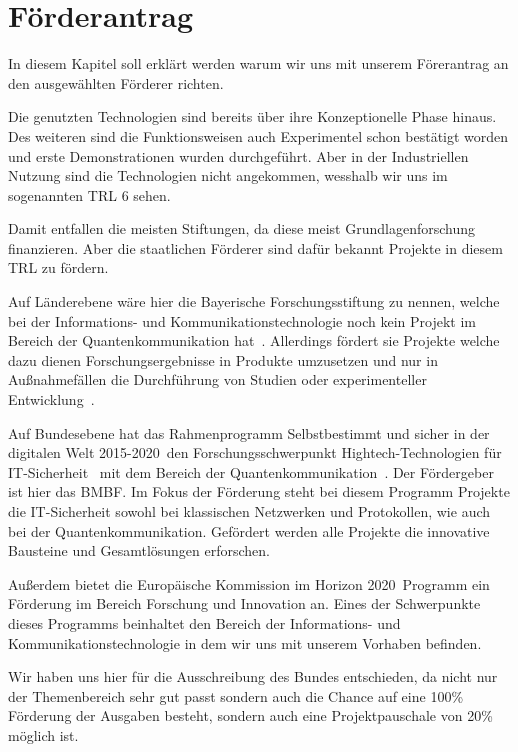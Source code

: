 \chapter{Förderantrag}\label{foerderantrag}

In diesem Kapitel soll erklärt werden warum wir uns mit unserem Förerantrag an den ausgewählten Förderer richten.

Die genutzten Technologien sind bereits über ihre Konzeptionelle Phase hinaus.
Des weiteren sind die Funktionsweisen auch Experimentel schon bestätigt worden und erste Demonstrationen wurden durchgeführt.
Aber in der Industriellen Nutzung sind die Technologien nicht angekommen, wesshalb wir uns im sogenannten \ac{TRL} 6 sehen.

Damit entfallen die meisten Stiftungen, da diese meist Grundlagenforschung finanzieren.
Aber die staatlichen Förderer sind dafür bekannt Projekte in diesem \ac{TRL} zu fördern.

Auf Länderebene wäre hier die Bayerische Forschungsstiftung zu nennen, welche bei der Informations- und Kommunikationstechnologie noch kein Projekt im Bereich der Quantenkommunikation hat~\cite{bayerischeForschungsstiftung}.
Allerdings fördert sie Projekte welche dazu dienen Forschungsergebnisse in Produkte umzusetzen und nur in Außnahmefällen die Durchführung von Studien oder experimenteller Entwicklung~\cite{bayerischeForschungsstiftung}.

Auf Bundesebene hat das Rahmenprogramm \glqq Selbstbestimmt und sicher in der digitalen Welt 2015-2020\grqq~den Forschungsschwerpunkt \glqq Hightech-Technologien für IT-Sicherheit \grqq~mit dem Bereich der Quantenkommunikation~\cite{BundRahmenprogramm}.
Der Fördergeber ist hier das \ac{BMBF}.
Im Fokus der Förderung steht bei diesem Programm Projekte die IT-Sicherheit sowohl bei klassischen Netzwerken und Protokollen, wie auch bei der Quantenkommunikation.
Gefördert werden alle Projekte die innovative Bausteine und Gesamtlösungen erforschen.

Außerdem bietet die Europäische Kommission im \glqq Horizon 2020\grqq~Programm ein Förderung im Bereich Forschung und Innovation an.
Eines der Schwerpunkte dieses Programms beinhaltet den Bereich der Informations- und Kommunikationstechnologie in dem wir uns mit unserem Vorhaben befinden.

Wir haben uns hier für die Ausschreibung des Bundes entschieden, da nicht nur der Themenbereich sehr gut passt sondern auch die Chance auf eine 100\% Förderung der Ausgaben besteht, sondern auch eine Projektpauschale von 20\% möglich ist.


